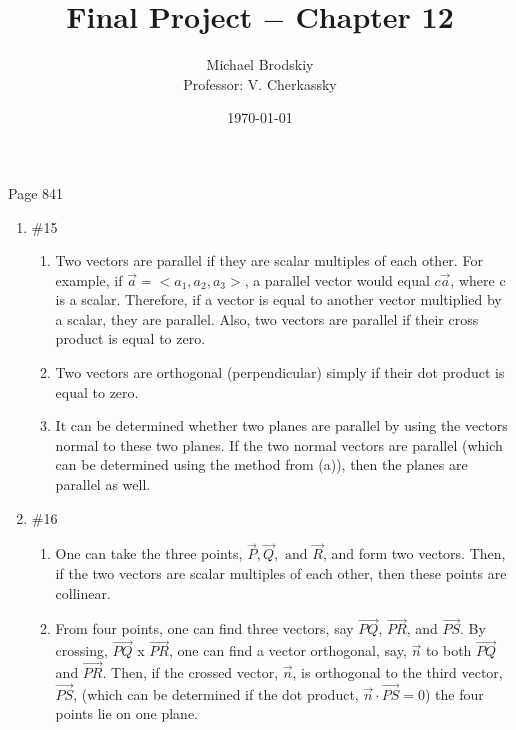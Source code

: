 \documentclass[12pt]{article}
\title{Final Project $-$ Chapter 12}
\date{\today}
\author{Michael Brodskiy\\ \small Professor: V. Cherkassky}
\begin{document}
\maketitle

\begin{center}

Page 841

\end{center}

\begin{enumerate}

  \item \#15 \begin{enumerate}

      \item Two vectors are parallel if they are scalar multiples of each other. For example, if $\overrightarrow{a}=<a_1,a_2,a_3>$, a parallel vector would equal $c\overrightarrow{a}$, where c is a scalar. Therefore, if a vector is equal to another vector multiplied by a scalar, they are parallel. Also, two vectors are parallel if their cross product is equal to zero.

     \item Two vectors are orthogonal (perpendicular) simply if their dot product is equal to zero.

     \item It can be determined whether two planes are parallel by using the vectors normal to these two planes. If the two normal vectors are parallel (which can be determined using the method from (a)), then the planes are parallel as well. 

    \end{enumerate}

  \item \#16 \begin{enumerate}

      \item One can take the three points, $\overrightarrow{P}, \overrightarrow{Q}, \text{ and } \overrightarrow{R}$, and form two vectors. Then, if the two vectors are scalar multiples of each other, then these points are collinear.

      \item From four points, one can find three vectors, say $\overrightarrow{PQ}$, $\overrightarrow{PR}$, and $\overrightarrow{PS}$. By crossing, $\overrightarrow{PQ}$ x $\overrightarrow{PR}$, one can find a vector orthogonal, say, $\overrightarrow{n}$ to both $\overrightarrow{PQ}$ and $\overrightarrow{PR}$. Then, if the crossed vector, $\overrightarrow{n}$, is orthogonal to the third vector, $\overrightarrow{PS}$, (which can be determined if the dot product, $\overrightarrow{n}\cdot\overrightarrow{PS}=0$) the four points lie on one plane. 


\end{enumerate}
\end{enumerate}
\end{document}
